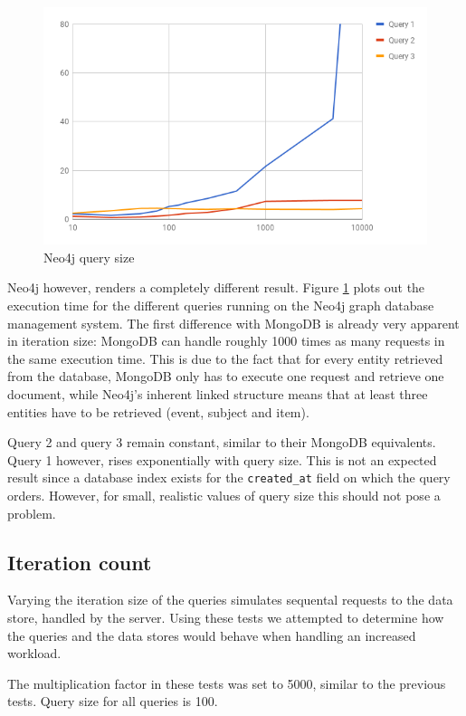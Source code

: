 \begin{figure}[H]
  \centering
  \includegraphics[width=.8\textwidth]{img/neo4j-query-size.png}
  \caption{Neo4j query size}
  \label{fig:neo4j-query-size}
\end{figure}

Neo4j however, renders a completely different result.
Figure \ref{fig:neo4j-query-size} plots out the execution time for the different queries running on the Neo4j graph database management system.
The first difference with MongoDB is already very apparent in iteration size: MongoDB can handle roughly 1000 times as many requests in the same execution time.
This is due to the fact that for every entity retrieved from the database, MongoDB only has to execute one request and retrieve one document, while Neo4j's inherent linked structure means that at least three entities have to be retrieved (event, subject and item).

Query 2 and query 3 remain constant, similar to their MongoDB equivalents.
Query 1 however, rises exponentially with query size.
This is not an expected result since a database index exists for the \texttt{created\_at} field on which the query orders.
However, for small, realistic values of query size this should not pose a problem.

\subsection{Iteration count}
\label{subsec:iteration-size}

Varying the iteration size of the queries simulates sequental requests to the data store, handled by the server.
Using these tests we attempted to determine how the queries and the data stores would behave when handling an increased workload.

The multiplication factor in these tests was set to 5000, similar to the previous tests.
Query size for all queries is 100.

